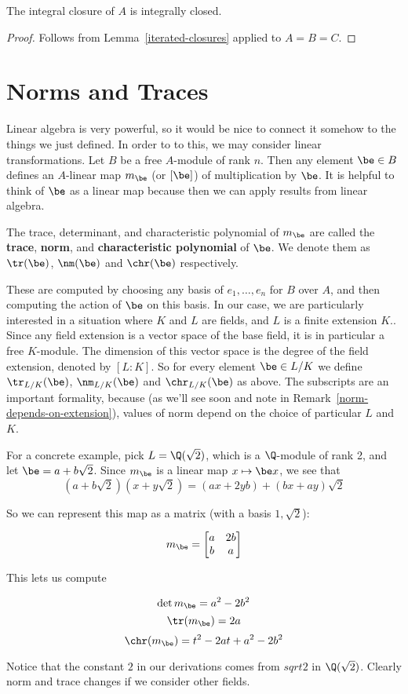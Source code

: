 \begin{pr}
The integral closure of $A$ is integrally closed.
\end{pr}
\begin{proof}
Follows from Lemma~\ref{iterated-closures} applied to $A=B=C$.\qedhere
\end{proof}

\section{Norms and Traces}
Linear algebra is very powerful, so it would be nice to connect it somehow to the things we just defined. In order to to this, we may consider linear transformations.
Let $B$ be a free $A$-module of rank $n$. Then any element $\be\in B$ defines an $A$-linear map $m_{\be}$ (or $[\be]$) of multiplication by $\be$. It is helpful to think of $\be$ as a linear map because then we can apply results from linear algebra.

\begin{df}
The trace, determinant, and characteristic polynomial of $m_{\be}$ are called the {\textbf{trace}}, {\textbf{norm}}, and {\textbf{characteristic polynomial}} of $\be$.
We denote them as $\tr(\be)$, $\nm(\be)$ and $\chr(\be)$ respectively.
\end{df}

\noindent These are computed by choosing any basis of $e_1,\ldots, e_n$ for $B$ over $A$, and then computing the action of $\be$ on this basis.
In our case, we are particularly interested in a situation where $K$ and $L$ are fields, and $L$ is a finite extension $K$..
Since any field extension is a vector space of the base field, it is in particular a free $K$-module. The dimension of this vector space is the degree of the field extension, denoted by $[L:K]$.
So for every element $\be \in L/K$ we define $\tr_{L/K}(\be)$, $\nm_{L/K}(\be)$ and $\chr_{L/K}(\be)$ as above.
The subscripts are an important formality, because (as we'll see soon and note in Remark~\ref{norm-depends-on-extension}), values of norm depend on the choice of particular $L$ and $K$.

\begin{ex}
For a concrete example, pick $L = \Q(\sqrt{2})$, which is a $\Q$-module of rank 2, and let $\be = a + b\sqrt{2}$. Since $m_\be$ is a linear map $x \mapsto \be x$, we see that
\[ (a + b\sqrt{2})(x + y\sqrt{2}) = (ax + 2yb) + (bx + ay)\sqrt{2} \]

So we can represent this map as a matrix (with a basis $1, \sqrt{2}$):

\[
m_\be =
\begin{bmatrix}
a & 2b \\
b & a
\end{bmatrix}
\]

This lets us compute

\[
\det{m_\be} = a^2 - 2b^2
\]
\[
\tr(m_\be) = 2a
\]
\[
\chr(m_\be) = t^2 - 2at + a^2 - 2b^2
\]

Notice that the constant $2$ in our derivations comes from $sqrt{2}$ in $\Q(\sqrt{2})$. Clearly norm and trace changes if we consider other fields.
\end{ex}

